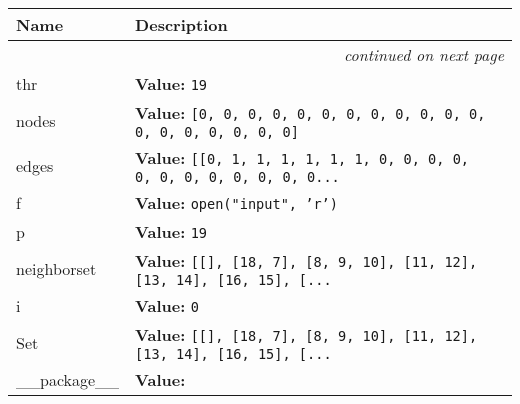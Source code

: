     \vspace{-1cm}
\hspace{\varindent}\begin{longtable}{|p{\varnamewidth}|p{\vardescrwidth}|l}
\cline{1-2}
\cline{1-2} \centering \textbf{Name} & \centering \textbf{Description}& \\
\cline{1-2}
\endhead\cline{1-2}\multicolumn{3}{r}{\small\textit{continued on next page}}\\\endfoot\cline{1-2}
\endlastfoot\raggedright t\-h\-r\- & \raggedright \textbf{Value:} 
{\tt 19}&\\
\cline{1-2}
\raggedright n\-o\-d\-e\-s\- & \raggedright \textbf{Value:} 
{\tt \texttt{[}0\texttt{, }0\texttt{, }0\texttt{, }0\texttt{, }0\texttt{, }0\texttt{, }0\texttt{, }0\texttt{, }0\texttt{, }0\texttt{, }0\texttt{, }0\texttt{, }0\texttt{, }0\texttt{, }0\texttt{, }0\texttt{, }0\texttt{, }0\texttt{, }0\texttt{]}}&\\
\cline{1-2}
\raggedright e\-d\-g\-e\-s\- & \raggedright \textbf{Value:} 
{\tt \texttt{[}\texttt{[}0\texttt{, }1\texttt{, }1\texttt{, }1\texttt{, }1\texttt{, }1\texttt{, }1\texttt{, }0\texttt{, }0\texttt{, }0\texttt{, }0\texttt{, }0\texttt{, }0\texttt{, }0\texttt{, }0\texttt{, }0\texttt{, }0\texttt{, }0\texttt{, }0\texttt{...}}&\\
\cline{1-2}
\raggedright f\- & \raggedright \textbf{Value:} 
{\tt open("input", 'r')}&\\
\cline{1-2}
\raggedright p\- & \raggedright \textbf{Value:} 
{\tt 19}&\\
\cline{1-2}
\raggedright n\-e\-i\-g\-h\-b\-o\-r\-s\-e\-t\- & \raggedright \textbf{Value:} 
{\tt \texttt{[}\texttt{[}\texttt{]}\texttt{, }\texttt{[}18\texttt{, }7\texttt{]}\texttt{, }\texttt{[}8\texttt{, }9\texttt{, }10\texttt{]}\texttt{, }\texttt{[}11\texttt{, }12\texttt{]}\texttt{, }\texttt{[}13\texttt{, }14\texttt{]}\texttt{, }\texttt{[}16\texttt{, }15\texttt{]}\texttt{, }\texttt{[}\texttt{...}}&\\
\cline{1-2}
\raggedright i\- & \raggedright \textbf{Value:} 
{\tt 0}&\\
\cline{1-2}
\raggedright S\-e\-t\- & \raggedright \textbf{Value:} 
{\tt \texttt{[}\texttt{[}\texttt{]}\texttt{, }\texttt{[}18\texttt{, }7\texttt{]}\texttt{, }\texttt{[}8\texttt{, }9\texttt{, }10\texttt{]}\texttt{, }\texttt{[}11\texttt{, }12\texttt{]}\texttt{, }\texttt{[}13\texttt{, }14\texttt{]}\texttt{, }\texttt{[}16\texttt{, }15\texttt{]}\texttt{, }\texttt{[}\texttt{...}}&\\
\cline{1-2}
\raggedright \_\-\_\-p\-a\-c\-k\-a\-g\-e\-\_\-\_\- & \raggedright \textbf{Value:} 

\end{longtable}
